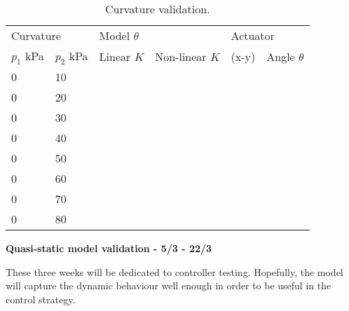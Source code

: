 \begin{table}[H]
    \centering
    \begin{tabular}{|l|l|l|l|l|l|}
    \hline
    \multicolumn{2}{|l|}{Curvature}   & \multicolumn{2}{l|}{Model $\theta$}      &  \multicolumn{2}{l|}{Actuator }  \\  \cline{1-6}
      $p_1$ kPa & $p_2$ kPa  &      Linear $K$ & Non-linear $K$        &         (x-y) &  Angle $\theta$       \\ \hline
         0     &    10      &              &                           &               &      \\
         0     &    20      &              &                           &               &      \\
         0     &    30      &              &                           &               &      \\
         0     &    40      &              &                           &               &      \\
         0     &    50      &              &                           &               &      \\
         0     &    60      &              &                           &               &      \\         
         0     &    70      &              &                           &               &      \\
         0     &    80      &              &                           &               &      \\
    \hline
\end{tabular}
    \caption{Curvature validation.}
    \label{tab:curv}
\end{table}


\textbf{Quasi-static model validation - 5/3 - 22/3}

These three weeks will be dedicated to controller testing. Hopefully, the model will capture the dynamic behaviour well enough in order to be useful in the control strategy.